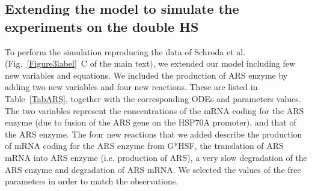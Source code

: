 \documentclass[oneside, 10pt, a4paper, twocolumn]{article}
\begin{document}
\subsection{Extending the model to simulate the experiments on the double HS}
\label{SecARSSM}

To perform the simulation reproducing the data of Schroda et al. \cite{Schroda2000} (Fig.~\ref{Figure3label}~C of the main text), we extended our model including few new variables and equations. 
We included the production of ARS enzyme by adding two new variables and four new reactions. 
These are listed in Table~\ref{TabARS}, together with the corresponding ODEs and parameters values.
The two variables represent the concentrations of the mRNA coding for the ARS enzyme (due to fusion of the ARS gene on the HSP70A promoter), and that of the ARS enzyme.
The four new reactions that we added describe the production of mRNA coding for the ARS enzyme from G*HSF, the translation of ARS mRNA into ARS enzyme (i.e. production of ARS), a very slow degradation of the ARS enzyme and degradation of ARS mRNA. 
We selected the values of the free parameters in order to match the observations. 
\end{document}
